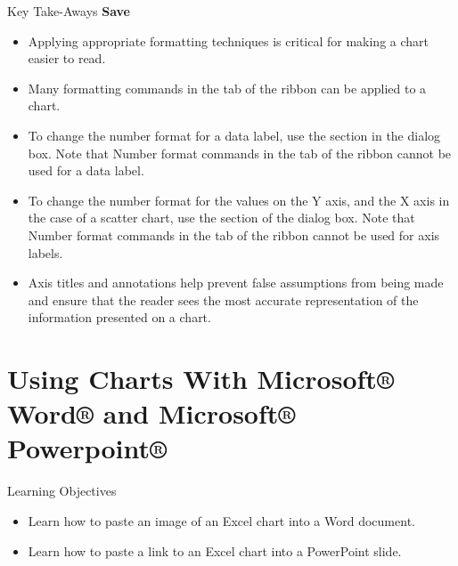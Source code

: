 \begin{center}
	\begin{tkwbox}{Key Take-Aways}
		\textbf{Save}
		\\
		\begin{itemize}
			\setlength{\itemsep}{0pt}
			\setlength{\parskip}{0pt}
			\setlength{\parsep}{0pt}

			\item Applying appropriate formatting techniques is critical for making a chart easier to read.
			\item Many formatting commands in the  tab of the ribbon can be applied to a chart.
			\item To change the number format for a data label, use the  section in the  dialog box. Note that Number format commands in the  tab of the ribbon cannot be used for a data label.
			\item To change the number format for the values on the Y axis, and the X axis in the case of a scatter chart, use the  section of the  dialog box. Note that Number format commands in the  tab of the ribbon cannot be used for axis labels.
			\item Axis titles and annotations help prevent false assumptions from being made and ensure that the reader sees the most accurate representation of the information presented on a chart.
			
		\end{itemize}
	\end{tkwbox}
\end{center}

\section{Using Charts With Microsoft® Word® and Microsoft® Powerpoint®}

\begin{center}
	\begin{objbox}{Learning Objectives}
		\begin{itemize}
			\setlength{\itemsep}{0pt}
			\setlength{\parskip}{0pt}
			\setlength{\parsep}{0pt}

			\item Learn how to paste an image of an Excel chart into a Word document.
			\item Learn how to paste a link to an Excel chart into a PowerPoint slide.
			
		\end{itemize}
	\end{objbox}
\end{center}

